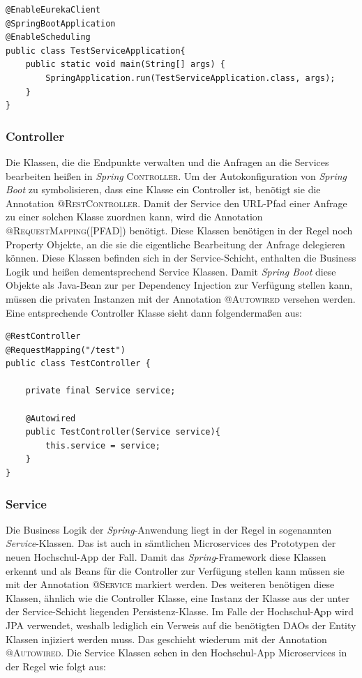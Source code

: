 \begin{lstlisting}[caption={Spring Application Klasse}]
@EnableEurekaClient
@SpringBootApplication
@EnableScheduling
public class TestServiceApplication{
    public static void main(String[] args) {
        SpringApplication.run(TestServiceApplication.class, args);
    }
} 
\end{lstlisting}

\subsubsection*{Controller}

Die Klassen, die die Endpunkte verwalten und die Anfragen an die Services bearbeiten heißen in \textit{Spring} \textsc{Controller}. Um der Autokonfiguration von \textit{Spring Boot} zu symbolisieren, dass eine Klasse ein Controller ist, benötigt sie die Annotation \textsc{@RestController}. Damit der Service den \ac{URL}-Pfad einer Anfrage zu einer solchen Klasse zuordnen kann, wird die Annotation \textsc{@RequestMapping([PFAD])} benötigt. Diese Klassen benötigen in der Regel noch Property Objekte, an die sie die eigentliche Bearbeitung der Anfrage delegieren können. Diese Klassen befinden sich in der Service-Schicht, enthalten die Business Logik und heißen dementsprechend Service Klassen. Damit \textit{Spring Boot} diese Objekte als Java-Bean zur per Dependency Injection zur Verfügung stellen kann, müssen die privaten Instanzen mit der Annotation \textsc{@Autowired} versehen werden. Eine entsprechende Controller Klasse sieht dann folgendermaßen aus:

\newpage
\begin{lstlisting}[caption={Spring Controller Klasse}]
@RestController
@RequestMapping("/test")
public class TestController {

    private final Service service;

    @Autowired
    public TestController(Service service){
        this.service = service;
    }
} 
\end{lstlisting}

\subsubsection*{Service}

Die Business Logik der \textit{Spring}-Anwendung liegt in der Regel in sogenannten \textit{Service}-Klassen. Das ist auch in sämtlichen Microservices des Prototypen der neuen Hochschul-\ac{App} der Fall. Damit das \textit{Spring}-Framework diese Klassen erkennt und als Beans für die Controller zur Verfügung stellen kann müssen sie mit der Annotation \textsc{@Service} markiert werden. Des weiteren benötigen diese Klassen, ähnlich wie die Controller Klasse, eine Instanz der Klasse aus der unter der Service-Schicht liegenden Persistenz-Klasse. Im Falle der Hochschul-\c{App} wird \ac{JPA} verwendet, weshalb lediglich ein Verweis auf die benötigten \acp{DAO} der Entity Klassen injiziert werden muss. Das geschieht wiederum mit der Annotation \textsc{@Autowired}. Die Service Klassen sehen in den Hochschul-\ac{App} Microservices in der Regel wie folgt aus:

